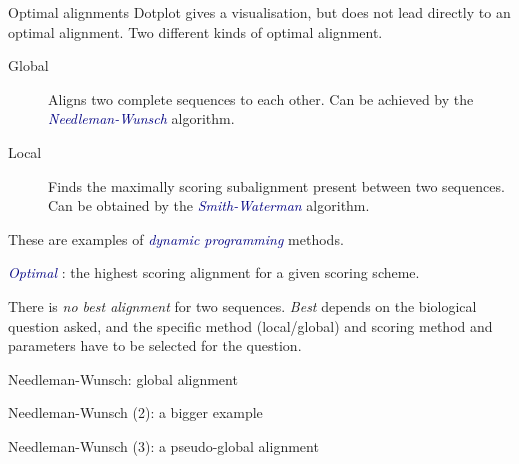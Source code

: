 \documentclass[pdf]{beamer}
\begin{document}
\begin{frame}{Optimal alignments}
  Dotplot gives a visualisation, but does not lead directly to
  an optimal alignment. Two different kinds of optimal alignment.
  \begin{description}
  \item[Global] Aligns two complete sequences to each other. Can
    be achieved by the \textcolor{navy}{\emph{Needleman-Wunsch}} algorithm.
  \item[Local] Finds the maximally scoring subalignment present
    between two sequences. Can be obtained by the \textcolor{navy}{\emph{Smith-Waterman}}
    algorithm.
  \end{description}
  \pause
  These are examples of \textcolor{navy}{\emph{dynamic programming}} methods.

  \textcolor{navy}{\emph{Optimal}} : the highest scoring alignment for a given scoring scheme.

  There is \emph{no best alignment} for two sequences. \emph{Best} depends on
  the biological question asked, and the specific method (local/global) and
  scoring method and parameters have to be selected for the question.
\end{frame}

\begin{frame}{Needleman-Wunsch: global alignment}
  \begin{figure}[ht]
    \begin{tikzpicture}[scale=0.5]
      
    \end{tikzpicture}
  \end{figure}

\end{frame}

\begin{frame}{Needleman-Wunsch (2): a bigger example}
  \begin{figure}[ht]
    \begin{tikzpicture}[scale=0.4]
      
    \end{tikzpicture}
  \end{figure}

\end{frame}

\begin{frame}{Needleman-Wunsch (3): a pseudo-global alignment}
  \begin{figure}[ht]
    \begin{tikzpicture}[scale=0.4]
      
    \end{tikzpicture}
  \end{figure}
\end{frame}
\end{document}
